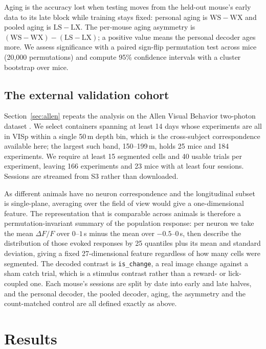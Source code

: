 \documentclass{article}
\begin{document}
Aging is the accuracy lost when testing moves from the held-out mouse's early data to its late block
while training stays fixed: personal aging is $\mathrm{WS}-\mathrm{WX}$ and pooled aging is
$\mathrm{LS}-\mathrm{LX}$. The per-mouse aging asymmetry is
$(\mathrm{WS}-\mathrm{WX})-(\mathrm{LS}-\mathrm{LX})$; a positive value means the personal decoder
ages more. We assess significance with a paired sign-flip permutation test across mice
(20{,}000 permutations) and compute 95\% confidence intervals with a cluster bootstrap over mice.

\subsection{The external validation cohort}
\label{sec:allencohort}
Section~\ref{sec:allen} repeats the analysis on the Allen
Visual Behavior two-photon dataset \citep{allenvb2023}. We select containers spanning at least 14
days whose experiments are all in VISp within a single 50\,\textmu m depth bin, which is the
cross-subject correspondence available here; the largest such band, 150--199\,\textmu m, holds 25
mice and 184 experiments. We require at least 15 segmented cells and 40 usable trials per
experiment, leaving 166 experiments and 23 mice with at least four sessions. Sessions are streamed
from S3 rather than downloaded.

As different animals have no neuron correspondence and the longitudinal subset is single-plane,
averaging over the field of view would give a one-dimensional feature. The representation that is
comparable across animals is
therefore a permutation-invariant summary of the population response: per neuron we take the mean
$\Delta F/F$ over $0$--$1$\,s minus the mean over $-0.5$--$0$\,s, then describe the distribution of
those evoked responses by 25 quantiles plus its mean and standard deviation, giving a fixed
27-dimensional feature regardless of how many cells were segmented. The decoded contrast is
\texttt{is\_change}, a real image change against a sham catch trial, which is a stimulus contrast
rather than a reward- or lick-coupled one. Each mouse's sessions are split by date into early and
late halves, and the personal decoder, the pooled decoder, aging, the asymmetry and the
count-matched control are all defined exactly as above.

\section{Results}
\end{document}
